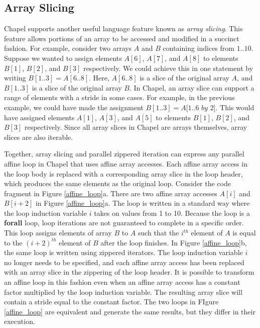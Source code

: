 \subsection{Array Slicing}\label{sec:array_slicing}

Chapel supports another useful language feature known as \textit{array slicing}. This feature allows portions of an array to be accessed and modified in a succinct fashion. For example, consider two arrays $A$ and $B$ containing indices from $1..10$. Suppose we wanted to assign elements $A[6]$, $A[7]$, and $A[8]$ to elements $B[1]$, $B[2]$, and $B[3]$ respectively. We could achieve this in one statement by writing $B[1..3] = A[6..8]$. Here, $A[6..8]$ is a slice of the original array $A$, and $B[1..3]$ is a slice of the original array $B$. In Chapel, an array slice can support a range of elements with a stride in some cases. For example, in the previous example, we could have made the assignment $B[1..3] = A[1..6$ $by$ $2]$. This would have assigned elements $A[1]$, $A[3]$, and $A[5]$ to elements $B[1]$, $B[2]$, and $B[3]$ respectively. Since all array slices in Chapel are arrays themselves, array slices are also iterable. 

Together, array slicing and parallel zippered iteration can express any parallel affine loop in Chapel that uses affine array accesses. Each affine array access in the loop body is replaced with a corresponding array slice in the loop header, which produces the same elements as the original loop. Consider the code fragment in Figure \ref{affine_loop}a. There are two affine array accesses $A[i]$ and $B[i+2]$ in Figure \ref{affine_loop}a. The loop is written in a standard way where the loop induction variable $i$ takes on values from 1 to 10. Because the loop is a \textbf{forall} loop, loop iterations are not guaranteed to complete in a specific order. This loop assigns elements of array $B$ to $A$ such that the $i^{th}$ element of $A$ is equal to the $(i+2)^{th}$ element of $B$ after the loop finishes. In Figure \ref{affine_loop}b, the same loop is written using zippered iterators. The loop induction variable $i$ no longer needs to be specified, and each affine array access has been replaced with an array slice in the zippering of the loop header. It is possible to transform an affine loop in this fashion even when an affine array access has a constant factor multiplied by the loop induction variable. The resulting array slice will contain a stride equal to the constant factor. The two loops in FIgure \ref{affine_loop} are equivalent and generate the same results, but they differ in their execution.

